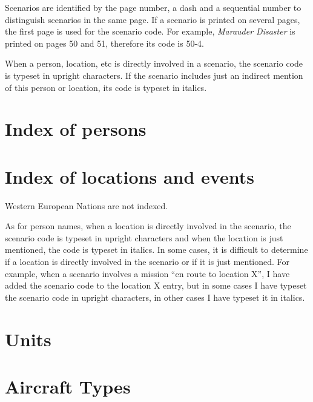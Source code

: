 \documentclass[a4paper,twocolumn]{article}
\begin{document}
Scenarios are identified by the page number, a dash and a
sequential number to distinguish scenarios in the same page. If
a scenario is printed on several pages, the first page is used for
the scenario code. For example, \textit{Marauder Disaster} is printed
on pages 50 and 51, therefore its code is 50-4.

When a person, location, etc is directly involved in a scenario,
the scenario code is typeset in upright characters. If the scenario
includes just an indirect mention of this person or location,
its code is typeset in italics.

\section*{Index of persons}

\vspace{3mm}


\section*{Index of locations and events}

Western European Nations are not indexed.

\vspace{3mm}

As for person names, when a location is directly involved in the
scenario, the scenario code is typeset in upright characters and when
the location is just mentioned, the code is typeset in italics.
In some cases, it is difficult to determine if a location is directly
involved in the scenario or if it is just mentioned. For example, when
a scenario involves a mission ``en route to location X'', I have
added the scenario code to the location X entry, but in some cases I have
typeset the scenario code in upright characters, in other cases I have
typeset it in italics.

\vspace{3mm}


\section*{Units}

\vspace{3mm}


\section*{Aircraft Types}
\end{document}

